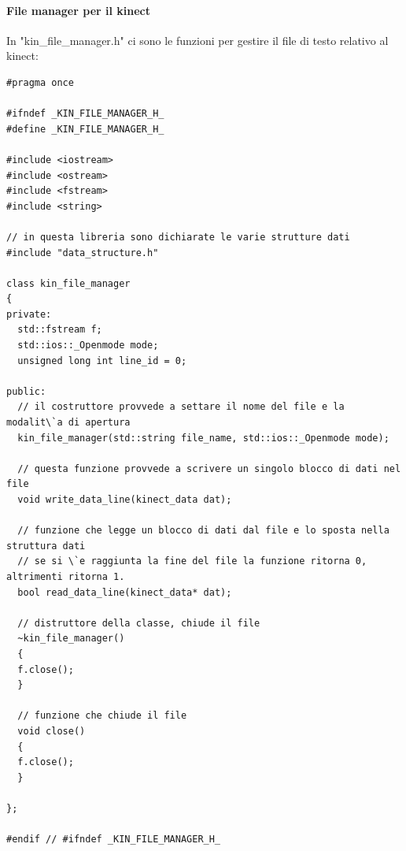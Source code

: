 \documentclass[10pt,a4paper]{article}
\begin{document}
\paragraph{File manager per il kinect}\label{par:kin_file_mng}
In "kin\_file\_manager.h" ci sono le funzioni per gestire il file di testo relativo al kinect:
\begin{lstlisting}[style=mycpp, caption=kin\_file\_manager.h, captionpos=b]
#pragma once

#ifndef _KIN_FILE_MANAGER_H_
#define _KIN_FILE_MANAGER_H_

#include <iostream>
#include <ostream>
#include <fstream>
#include <string>

// in questa libreria sono dichiarate le varie strutture dati
#include "data_structure.h"

class kin_file_manager
{
private:
  std::fstream f;
  std::ios::_Openmode mode;
  unsigned long int line_id = 0;

public:
  // il costruttore provvede a settare il nome del file e la modalit\`a di apertura
  kin_file_manager(std::string file_name, std::ios::_Openmode mode);

  // questa funzione provvede a scrivere un singolo blocco di dati nel file
  void write_data_line(kinect_data dat);

  // funzione che legge un blocco di dati dal file e lo sposta nella struttura dati
  // se si \`e raggiunta la fine del file la funzione ritorna 0, altrimenti ritorna 1. 
  bool read_data_line(kinect_data* dat);

  // distruttore della classe, chiude il file
  ~kin_file_manager()
  {
  f.close();
  }

  // funzione che chiude il file
  void close()
  {
  f.close();
  }

};

#endif // #ifndef _KIN_FILE_MANAGER_H_
\end{lstlisting}
%
%
\end{document}
